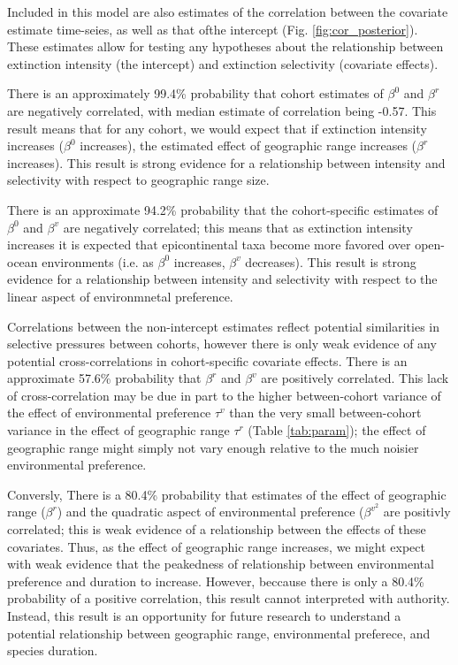 \documentclass[11pt]{article}
\begin{document}
Included in this model are also estimates of the correlation between the covariate estimate time-seies, as well as that ofthe intercept (Fig. \ref{fig:cor_posterior}). These estimates allow for testing any hypotheses about the relationship between extinction intensity (the intercept) and extinction selectivity (covariate effects). 

There is an approximately 99.4\% probability that cohort estimates of \(\beta^{0}\) and \(\beta^{r}\) are negatively correlated, with median estimate of correlation being -0.57. This result means that for any cohort, we would expect that if extinction intensity increases (\(\beta^{0}\) increases), the estimated effect of geographic range increases (\(\beta^{r}\) increases). This result is strong evidence for a relationship between intensity and selectivity with respect to geographic range size.

There is an approximate 94.2\% probability that the cohort-specific estimates of \(\beta^{0}\) and \(\beta^{v}\) are negatively correlated; this means that as extinction intensity increases it is expected that epicontinental taxa become more favored over open-ocean environments (i.e. as \(\beta^{0}\) increases, \(\beta^{v}\) decreases). This result is strong evidence for a relationship between intensity and selectivity with respect to the linear aspect of environmnetal preference. 

Correlations between the non-intercept estimates reflect potential similarities in selective pressures between cohorts, however there is only weak evidence of any potential cross-correlations in cohort-specific covariate effects. There is an approximate 57.6\% probability that \(\beta^{r}\) and \(\beta^{v}\) are positively correlated. This lack of cross-correlation may be due in part to the higher between-cohort variance of the effect of environmental preference \(\tau^{v}\) than the very small between-cohort variance in the effect of geographic range \(\tau^{r}\) (Table \ref{tab:param}); the effect of geographic range might simply not vary enough relative to the much noisier environmental preference. 

Conversly, There is a 80.4\% probability that estimates of the effect of geographic range (\(\beta^{r}\)) and the quadratic aspect of environmental preference (\(\beta^{v^{2}}\) are positivly correlated; this is weak evidence of a relationship between the effects of these covariates. Thus, as the effect of geographic range increases, we might expect with weak evidence that the peakedness of relationship between environmental preference and duration to increase. However, beccause there is only a 80.4\% probability of a positive correlation, this result cannot interpreted with authority. Instead, this result is an opportunity for future research to understand a potential relationship between geographic range, environmental preferece, and species duration.
\end{document}
